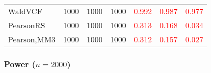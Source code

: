 \documentclass[
]{article}
\begin{document}
\begin{table}[H]
{\begin{tabular}[t]{lrrrrrr}
\hspace{1em}WaldVCF & 1000 & 1000 & 1000 & \textcolor{red}{0.992} & \textcolor{red}{0.987} & \textcolor{red}{0.977}\\
\hspace{1em}PearsonRS & 1000 & 1000 & 1000 & \textcolor{red}{0.313} & \textcolor{red}{0.168} & \textcolor{red}{0.034}\\
\hspace{1em}Pearson,MM3 & 1000 & 1000 & 1000 & \textcolor{red}{0.312} & \textcolor{red}{0.157} & \textcolor{red}{0.027}\\
\bottomrule
\end{tabular}}
\endgroup{}
\end{table}

\hypertarget{power-n2000-3}{%
\subsubsection{\texorpdfstring{Power
(\(n=2000\))}{Power (n=2000)}}\label{power-n2000-3}}
\end{document}

